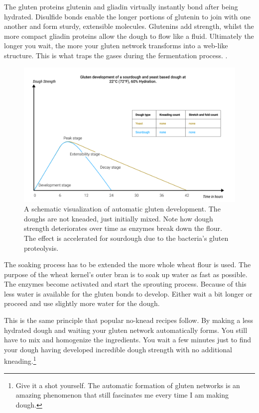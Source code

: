 The gluten proteins glutenin and gliadin virtually instantly bond after being
hydrated. Disulfide bonds enable the longer portions of
glutenin to join with one another and form sturdy, extensible molecules.
Glutenins add strength, whilst the more compact gliadin proteins allow
the dough to flow like a fluid. Ultimately the longer you wait, the more
your gluten network transforms into a web-like structure. This is what
traps the gases during the fermentation process. \cite{how+does+gluten+work}.

\begin{figure}[!htb]
  \includegraphics[width=\textwidth]{dough-strength-sourdough-yeast}
  \caption{A schematic visualization of
  automatic gluten development. The doughs are not kneaded, just initially
  mixed. Note how dough strength
  deteriorates over time as enzymes break down the flour. The effect
  is accelerated for sourdough due to the bacteria's gluten proteolysis.
  }
  \label{fig:wheat-yeast-sourdough-degradation}
\end{figure}

The soaking process has to be extended the more whole wheat flour is used.
The purpose of the wheat kernel's outer bran is to soak up water as fast
as possible. The enzymes become activated and start the sprouting process.
Because of this less water is available for the gluten bonds to develop.
Either wait a bit longer or proceed and use slightly more water for
the dough.

This is the same principle that popular no-knead recipes follow. By making a less
hydrated dough and waiting your gluten network automatically forms. You still
have to mix and homogenize the ingredients. You wait a few minutes just to
find your dough having developed incredible dough strength with no additional
kneading.\footnote{Give it a shot yourself. The automatic formation of gluten
networks is an amazing phenomenon that still fascinates me every time I am
making dough.}

